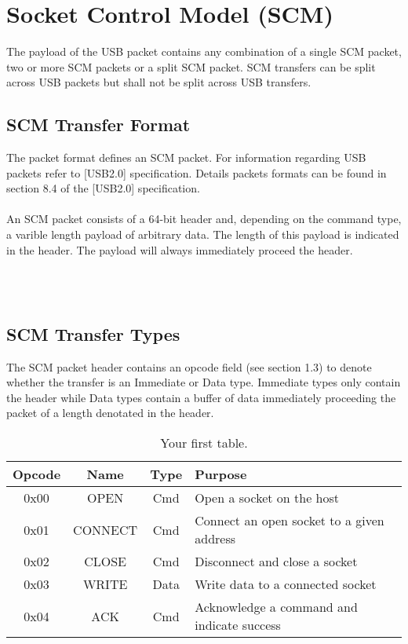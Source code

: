 \documentclass[10pt]{article}
\begin{document}
	\section{Socket Control Model (SCM)}
	The payload of the USB packet contains any combination of a single SCM packet, 
	two or more SCM packets or a split SCM packet. SCM transfers can be split across USB packets but shall not be split across USB transfers. 
	\subsection{SCM Transfer Format}
	The packet format defines an SCM packet. For information regarding USB packets refer to [USB2.0] specification. Details packets formats can be found in section 8.4 of the [USB2.0] specification. \\
	\\
	An SCM packet consists of a 64-bit header and, depending on the command type, a varible length payload of arbitrary data. The length of this payload is indicated in the header.  The payload will always immediately proceed the header. \\
	\\
	\centerline {
	} \\
	\subsection{SCM Transfer Types}
	The SCM packet header contains an opcode field (see section 1.3) to denote whether the transfer is an Immediate or Data type. Immediate types only contain the header while Data types contain a buffer of data immediately proceeding the packet of a length denotated in the header.\\

	\begin{table}[h!]
		\begin{center}
			\caption{Your first table.}
			\label{tab:table1}
			\begin{tabular}{c|c|c|l} 
				\rowcolor{lightgray}
				\textbf{Opcode} &	\textbf{Name} &	\textbf{Type} & \textbf{Purpose}\\
				\hline
				0x00 & OPEN & Cmd & Open a socket on the host\\
				0x01 & CONNECT & Cmd & Connect an open socket to a given address\\
				0x02 & CLOSE & Cmd & Disconnect and close a socket\\
				0x03 & WRITE	 & Data & Write data to a connected socket\\
				0x04 & ACK	& Cmd & Acknowledge a command and indicate success\\
			\end{tabular}
		\end{center}
	\end{table}
\end{document}
